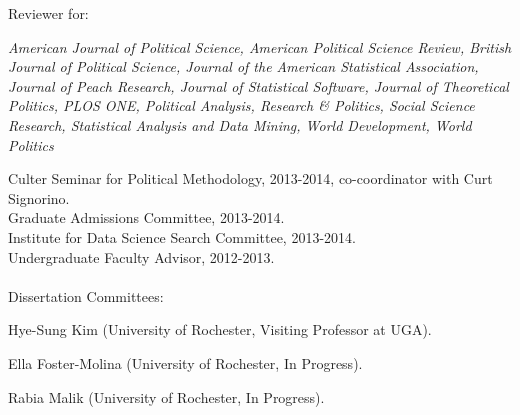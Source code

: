 \documentclass[margin,line]{res}
\newenvironment{list1}{
  \begin{list}{\ding{113}}{%
      \setlength{\itemsep}{0in}
      \setlength{\parsep}{0in} \setlength{\parskip}{0in}
      \setlength{\topsep}{0in} \setlength{\partopsep}{0in} 
      \setlength{\leftmargin}{0.83 cm}}}{\end{list}}
\begin{document}
\begin{resume}
Reviewer for:
\begin{list1}
\item[] \emph{American Journal of Political Science, American Political Science Review,  British Journal of Political Science, Journal of the American Statistical Association, Journal of Peach Research, Journal of Statistical Software, Journal of Theoretical Politics, PLOS ONE, Political Analysis, Research \& Politics, Social Science Research,  Statistical Analysis and Data Mining, World Development, World Politics}
\end{list1}
Culter Seminar for Political Methodology, 2013-2014, co-coordinator with Curt Signorino. \\
Graduate Admissions Committee, 2013-2014.\\
Institute for Data Science Search Committee, 2013-2014.\\
Undergraduate Faculty Advisor, 2012-2013. \\ 
\\
Dissertation Committees:
\begin{list1}
\item[] Hye-Sung Kim (University of Rochester, Visiting Professor at UGA).
\item[] Ella Foster-Molina (University of Rochester, In Progress).
\item[] Rabia Malik (University of Rochester, In Progress).
\end{list1}



\end{resume}
\end{document}
